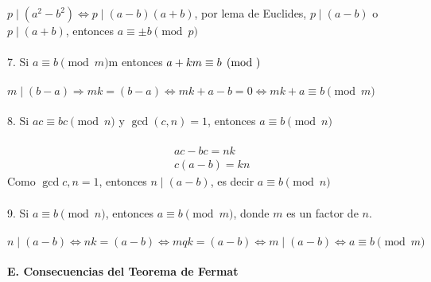 \documentclass{article}
\begin{document}
\\
\\
$p \mid (a^{2}-b^{2}) \Longleftrightarrow p \mid (a-b)(a+b)$, por lema de Euclides, $p \mid (a-b)$ o $p \mid (a+b)$, entonces $a \equiv \pm b \pmod{p}$
\\
\\
7. Si $a \equiv b \pmod{m}$m entonces $a+km \equiv b \pmod$
\\
\\
$m \mid (b-a) \Longrightarrow mk=(b-a) \Longleftrightarrow mk+a-b = 0 \Longleftrightarrow mk+a \equiv b \pmod{m}$
\\
\\
8. Si $ac \equiv bc \pmod{n}$ y $\gcd{(c,n)}=1$, entonces $a \equiv b \pmod{n}$
\\
\\
\begin{equation*}
\begin{aligned}
    &ac-bc=nk \\
    &c(a-b) = kn
\end{aligned}
\end{equation*}
Como $\gcd{c,n}=1$, entonces $n \mid (a-b)$, es decir $a \equiv b \pmod{n}$
\\
\\
9. Si $a \equiv b \pmod{n}$, entonces $a \equiv b \pmod{m}$, donde $m$ es un factor de $n$.
\\
\\
$n \mid (a-b) \Longleftrightarrow nk = (a-b) \Longleftrightarrow mqk=(a-b) \Longleftrightarrow m \mid (a-b) \Longleftrightarrow a \equiv b \pmod{m}$
\\
\\
\textbf{E. Consecuencias del Teorema de Fermat}
\end{document}
